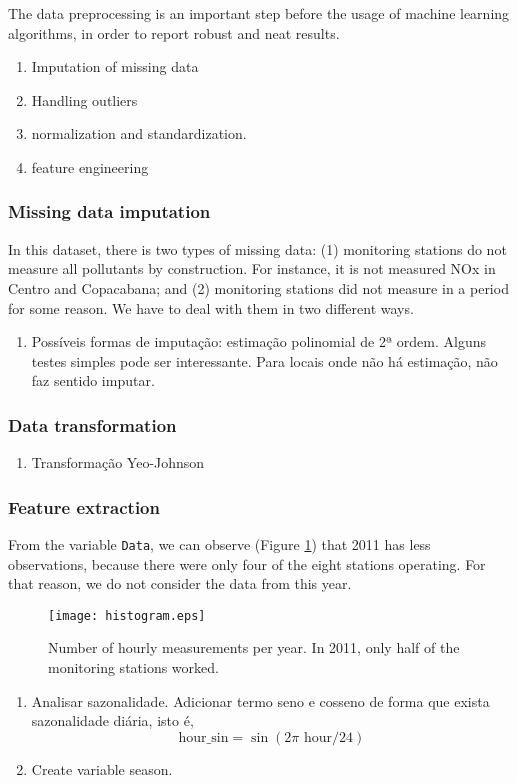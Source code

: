 The data preprocessing is an important step before the usage of machine
learning algorithms, in order to report robust and neat results. 

\begin{enumerate}
    \item Imputation of missing data
    \item Handling outliers
    \item normalization and standardization. 
    \item feature engineering
\end{enumerate}

\subsubsection{Missing data imputation}

In this dataset, there is two types of missing data: (1) monitoring stations
do not measure all pollutants by construction. For instance, it is not
measured NOx in Centro and Copacabana; and (2) monitoring stations did not
measure in a period for some reason. We have to deal with them in two
different ways. 

\begin{enumerate}
    \item Possíveis formas de imputação: estimação polinomial de 2ª ordem.
    Alguns testes simples pode ser interessante. Para locais onde não há
    estimação, não faz sentido imputar. 
\end{enumerate}

\subsubsection{Data transformation}

\begin{enumerate}
    \item Transformação Yeo-Johnson 
\end{enumerate}

\subsubsection{Feature extraction}

From the variable {\tt Data}, we can observe (Figure
\ref{fig:histogram-obs-years}) that 2011 has less observations, because there
were only four of the eight stations operating. For that reason, we do not
consider the data from this year. 

\begin{figure}
    \begin{center}
        \texttt{[image: histogram.eps]}
    \end{center}
    \caption{Number of hourly measurements per year. In 2011, only half of the monitoring stations worked.}
    \label{fig:histogram-obs-years}
\end{figure}

\begin{enumerate}
    \item Analisar sazonalidade. Adicionar termo seno e cosseno de forma que
    exista sazonalidade diária, isto é, 
    $$
    \text{hour\_sin} = \sin(2\pi \text{ hour}/24)
    $$
    \item Create variable season.   
\end{enumerate}